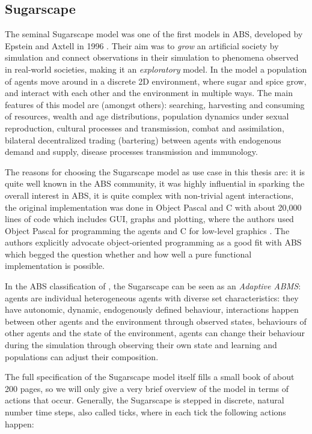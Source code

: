 \subsection{Sugarscape}
\label{sec:sugarscape}

The seminal Sugarscape model was one of the first models in ABS, developed by Epstein and Axtell in 1996 \cite{epstein_growing_1996}. Their aim was to \textit{grow} an artificial society by simulation and connect observations in their simulation to phenomena observed in real-world societies, making it an \textit{exploratory} model. In the model a population of agents move around in a discrete 2D environment, where sugar and spice grow, and interact with each other and the environment in multiple ways. The main features of this model are (amongst others): searching, harvesting and consuming of resources, wealth and age distributions, population dynamics under sexual reproduction, cultural processes and transmission, combat and assimilation, bilateral decentralized trading (bartering) between agents with endogenous demand and supply, disease processes transmission and immunology.

The reasons for choosing the Sugarscape model as use case in this thesis are: it is quite well known in the ABS community, it was highly influential in sparking the overall interest in ABS, it is quite complex with non-trivial agent interactions, the original implementation was done in Object Pascal and C with about 20,000 lines of code which includes GUI, graphs and plotting, where the authors used Object Pascal for programming the agents and C for low-level graphics \cite{axtell_aligning_1996}. The authors explicitly advocate object-oriented programming as a good fit with ABS which begged the question whether and how well a pure functional implementation is possible. 

In the ABS classification of \cite{macal_everything_2016}, the Sugarscape can be seen as an \textit{Adaptive ABMS}: agents are individual heterogeneous agents with diverse set characteristics: they have autonomic, dynamic, endogenously defined behaviour, interactions happen between other agents and the environment through observed states, behaviours of other agents and the state of the environment, agents can change their behaviour during the simulation through observing their own state and learning and populations can adjust their composition.

The full specification of the Sugarscape model itself fills a small book \cite{epstein_growing_1996} of about 200 pages, so we will only give a very brief overview of the model in terms of actions that occur. Generally, the Sugarscape is stepped in discrete, natural number time steps, also called ticks, where in each tick the following actions happen:

